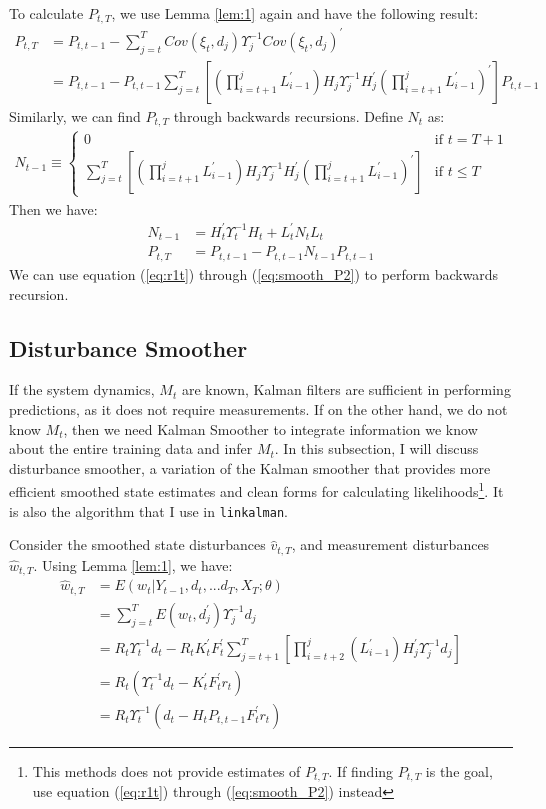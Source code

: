 \documentclass[12pt]{article}
\numberwithin{equation}{section}
\begin{document}
To calculate $P_{t,T}$, we use Lemma \ref{lem:1} again and have the following result:
\begin{align*}
    P_{t,T} &= P_{t,t-1} - \sum_{j=t}^TCov(\xi_t,d_j)\Upsilon_j^{-1}Cov(\xi_t,d_j)^{'} \\
    &=P_{t,t-1} - P_{t,t-1}\sum_{j=t}^{T}\left[\left(\prod_{i=t+1}^{j}L_{i-1}^{'}\right)H_j\Upsilon_j^{-1}H_j^{'}\left(\prod_{i=t+1}^{j}L_{i-1}^{'}\right)^{'}\right]P_{t,t-1}
\end{align*}
Similarly, we can find $P_{t,T}$ through backwards recursions. Define $N_t$ as:
\begin{align*}
    N_{t-1} \equiv \begin{cases}
        0 & \text{if $t=T+1$} \\
        \sum_{j=t}^{T}\left[\left(\prod_{i=t+1}^{j}L_{i-1}^{'}\right)H_j\Upsilon_j^{-1}H_j^{'}\left(\prod_{i=t+1}^{j}L_{i-1}^{'}\right)^{'}\right] & \text{if $t\leq T$}
    \end{cases}
\end{align*}
Then we have:
\begin{align}
    N_{t-1} &= H_t^{'}\Upsilon_t^{-1}H_t + L_t^{'}N_tL_t \label{eq:N1t} \\
    P_{t,T} &= P_{t,t-1}- P_{t,t-1}N_{t-1}P_{t,t-1} \label{eq:smooth_P2}
\end{align}
We can use equation (\ref{eq:r1t}) through (\ref{eq:smooth_P2}) to perform backwards recursion.

\subsection{Disturbance Smoother}
If the system dynamics, $M_t$ are known, Kalman filters are sufficient in performing predictions, as it does not require measurements. If on the other hand, we do not know $M_t$, then we need Kalman Smoother to integrate information we know about the entire training data and infer $M_t$. In this subsection, I will discuss disturbance smoother, a variation of the Kalman smoother that provides more efficient smoothed state estimates and clean forms for calculating likelihoods\footnote{This methods does not provide estimates of $P_{t,T}$. If finding $P_{t,T}$ is the goal, use equation (\ref{eq:r1t}) through (\ref{eq:smooth_P2}) instead}. It is also the algorithm that I use in \texttt{linkalman}. 

Consider the smoothed state disturbances $\hat{v}_{t,T}$, and measurement disturbances $\hat{w}_{t,T}$. Using Lemma \ref{lem:1}, we have:
\begin{align}
    \hat{w}_{t,T} &= E(w_t|Y_{t-1}, d_t,...d_T,X_T;\theta) \nonumber \\
    &= \sum_{j=t}^TE(w_t,d_j^{'})\Upsilon_j^{-1}d_j \nonumber \\
    &= R_t\Upsilon_t^{-1}d_t - R_tK_t^{'}F_t^{'}\sum_{j=t+1}^T\left[\prod_{i=t+2}^j\left(L_{i-1}^{'}\right)H_j^{'}\Upsilon_j^{-1}d_j\right] \nonumber \\
    &= R_t(\Upsilon_t^{-1}d_t - K_t^{'}F_t^{'}r_t) \nonumber \\
    &= R_t\Upsilon_t^{-1}(d_t - H_tP_{t,t-1}F_t^{'}r_t) \label{eq:disturb_w}
\end{align}
\end{document}
